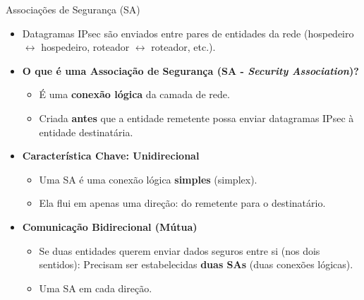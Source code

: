\begin{frame}{Associações de Segurança (SA)}
    \begin{itemize}
        \item Datagramas IPsec são enviados entre pares de entidades da rede (hospedeiro $\leftrightarrow$ hospedeiro, roteador $\leftrightarrow$ roteador, etc.).

        \item \textbf{O que é uma Associação de Segurança (SA - \textit{Security Association})?}
              \begin{itemize}

                  \item É uma \textbf{conexão lógica} da camada de rede.
                  \item Criada \textbf{antes} que a entidade remetente possa enviar datagramas IPsec à entidade destinatária.
              \end{itemize}

        \item \textbf{Característica Chave: Unidirecional}
              \begin{itemize}
                  \item Uma SA é uma conexão lógica \textbf{simples} (simplex).
                  \item Ela flui em apenas uma direção: do remetente para o destinatário.
              \end{itemize}

        \item \textbf{Comunicação Bidirecional (Mútua)}
              \begin{itemize}
                  \item Se duas entidades querem enviar dados seguros entre si (nos dois sentidos): Precisam ser estabelecidas \textbf{duas SAs} (duas conexões lógicas).
                  \item Uma SA em cada direção.
              \end{itemize}
    \end{itemize}
\end{frame}

